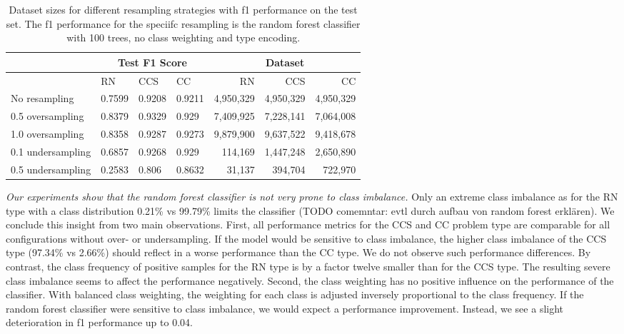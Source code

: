 \begin{table}[]
\tabcolsep=0.11cm
\begin{tabularx}{\textwidth}{lXXX|rrr}
\toprule
                    & \multicolumn{3}{c}{Test F1 Score} & \multicolumn{3}{c}{Dataset}   \\ \midrule
                    & RN        & CCS        & CC     & RN            & CCS         & CC          \\ \midrule
No resampling     &  0.7599   &  0.9208    &  0.9211  &  4,950,329    & 4,950,329   & 4,950,329   \\
0.5 oversampling  &  0.8379   &  0.9329    &  0.929   &  7,409,925    & 7,228,141   & 7,064,008   \\
1.0 oversampling  &  0.8358   &  0.9287    &  0.9273  &  9,879,900    & 9,637,522   & 9,418,678   \\ \midrule
0.1 undersampling &  0.6857   &  0.9268    &  0.929   &  114,169      & 1,447,248   & 2,650,890   \\
0.5 undersampling &  0.2583   &  0.806     &  0.8632  &  31,137       & 394,704     & 722,970     \\ \bottomrule
\end{tabularx}
\caption{Dataset sizes for different resampling strategies with f1 performance on the test set. The f1 performance for the speciifc resampling is the random forest classifier with 100 trees, no class weighting and type encoding.}
\label{tab:resampling_size_performance_rf}
\end{table}

\textit{Our experiments show that the random forest classifier is not very prone to class imbalance.} Only an extreme class imbalance as for the RN type with a class distribution 0.21\% vs 99.79\% limits the classifier (TODO comemntar: evtl durch aufbau von random forest erklären). We conclude this insight from two main observations. 
First, all performance metrics for the CCS and CC problem type are comparable for all configurations without over- or undersampling. If the model would be sensitive to class imbalance, the higher class imbalance of the CCS type (97.34\% vs 2.66\%) should reflect in a worse performance than the CC type. We do not observe such performance differences. By contrast, the class frequency of positive samples for the RN type is by a factor twelve smaller than for the CCS type. The resulting severe class imbalance seems to affect the performance negatively. 
Second, the class weighting has no positive influence on the performance of the classifier. With balanced class weighting, the weighting for each class is adjusted inversely proportional to the class frequency. If the random forest classifier were sensitive to class imbalance, we would expect a performance improvement. Instead, we see a slight deterioration in f1 performance up to 0.04.


